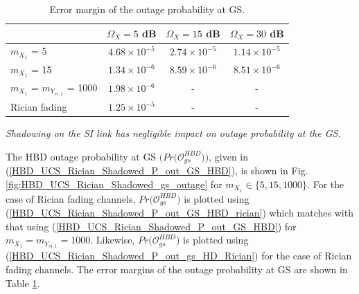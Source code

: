 \begin{table}[t]
\centering 
\caption{Error margin of the outage probability at GS.}
\label{table:HBD_UCS_Rician_Shadowed_marg_gs}
\begin{tabular}{lccc}
\hline
																	& $\Omega_X = 5$ dB			& $\Omega_X = 15$ dB		& $\Omega_X = 30$ dB 		\\  \hline \hline
$m_{X_1}$ = 5 										& $4.68\times 10^{-5}$ 	& $2.74\times 10^{-5}$ 	& $1.14\times 10^{-5}$ 	\\
$m_{X_1}$ = 15 										& $1.34\times 10^{-6}$	& $8.59\times 10^{-6}$	& $8.51\times 10^{-6}$ 	\\
$m_{X_1}$ = $m_{Y_{si,1}}$ = 1000 & $1.98\times 10^{-6}$ 	&	-											& -											\\
Rician fading											& $1.25\times 10^{-5}$	& -											& -									 		\\
\hline
\end{tabular}
\end{table}


\begin{observation}
\emph{\emph{Shadowing on the SI link has negligible impact on outage probability at the GS.}
}\end{observation}

The HBD outage probability at GS $\big(Pr\big(\mathcal{O}_{gs}^{HBD}\big)\big)$, given in (\ref{HBD_UCS_Rician_Shadowed_P_out_GS_HBD}), is shown in Fig. \ref{fig:HBD_UCS_Rician_Shadowed_gs_outage} for $m_{X_1} \in \{5, 15, 1000\}$. For the case of Rician fading channels, $Pr\big(\mathcal{O}_{gs}^{HBD}\big)$ is plotted using (\ref{HBD_UCS_Rician_Shadowed_P_out_GS_HBD_rician}) which matches with that using (\ref{HBD_UCS_Rician_Shadowed_P_out_GS_HBD}) for $m_{X_1}=m_{Y_{si,1}}=1000$. Likewise, $Pr\big(\mathcal{O}_{gs}^{HBD}\big)$ is plotted using (\ref{HBD_UCS_Rician_Shadowed_P_out_gs_HD_Rician}) for the case of Rician fading channels. The error margins of the outage probability at GS are shown in Table \ref{table:HBD_UCS_Rician_Shadowed_marg_gs}.

